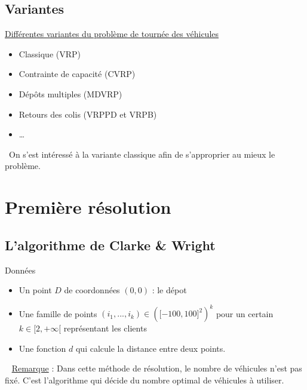 \documentclass[10pt]{beamer}
\begin{document}
	\subsection{Variantes}
	
	\begin{frame}
		\underline{Différentes variantes du problème de tournée des véhicules}
		\begin{itemize}[label=—]
			\item Classique (VRP)\pause
			\item Contrainte de capacité (CVRP)\pause
			\item Dépôts multiples (MDVRP)\pause
			\item Retours des colis (VRPPD et VRPB)\pause
			\item \dots 
		\end{itemize}
		\ \newline On s'est intéressé à la variante classique afin de s'approprier au mieux le problème.
	\end{frame}
	
	\section{Première résolution}

	\subsection{L'algorithme de Clarke \& Wright}

	\begin{frame}
		\begin{beamerboxesrounded}[upper=data_up,lower=data_low,shadow=true]{Données}
			\begin{itemize}[label=-]
				\item Un point $D$ de coordonnées $(0,0)$ : le dépot
				\pause
				\item Une famille de points \((i_1,...,i_k) \in {(\lbrack-100,100\rbrack^2)}^k\) pour un certain $k \in \lbrack2,+\infty\lbrack$ représentant les clients
				\pause
				\item Une fonction $d$ qui calcule la distance entre deux points.
				\pause
			\end{itemize}
		\end{beamerboxesrounded}\ \newline
		\underline{Remarque} : Dans cette méthode de résolution, le nombre de véhicules n'est pas fixé. C'est l'algorithme qui décide du nombre optimal de véhicules à utiliser. 
	\end{frame}
	 
\end{document}
